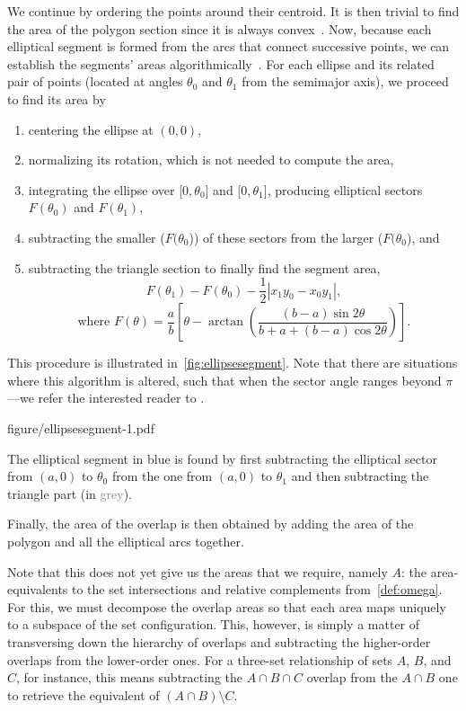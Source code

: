 \documentclass[
  oneside,
  openany,
  numbers=noendperiod,
  parskip=half,
  bibliography=totoc
]{scrbook}\usepackage[]{graphicx}\usepackage{xcolor}
\begin{document}
We continue by ordering the points around their centroid. It is then trivial to
find the area of the
polygon section since it is always convex~\citep{Finley_2006}. Now, because each
elliptical segment is formed from the arcs that connect successive
points, we can establish the segments' areas algorithmically~\citep{Eberly_2016}.
For each ellipse and its related pair of points (located at angles $\theta_0$ and
$\theta_1$ from the semimajor axis), we proceed to find its area by
\begin{enumerate}
\item centering the ellipse at $(0, 0)$,
\item normalizing its rotation, which is not needed to compute the area,
\item integrating the ellipse over [$0,\theta_0$] and [$0,\theta_1$], producing
  elliptical sectors $F(\theta_0)$ and $F(\theta_1)$,
\item subtracting the smaller ($F(\theta_0$)) of these sectors from the larger ($F(\theta_0$), and
\item subtracting the triangle section to finally find the segment area,
  \begin{equation*}
  F(\theta_1) - F(\theta_0) - \frac{1}{2}\left|x_1y_0 - x_0y_1\right|,
  \label{eq:segmentArea}
  \end{equation*}
  \[
  \text{where } F(\theta) = \frac{a}{b}\left[ \theta - \arctan{\left(\frac{(b - a)\sin{2\theta}}{b + a +(b - a )\cos{2\theta}} \right)}\right].
  \]
\end{enumerate}
This procedure is illustrated in~\cref{fig:ellipsesegment}. Note that there are
situations where this algorithm is altered, such that when the sector angle
ranges beyond $\pi$---we refer the interested reader to \citet{Eberly_2016}.

\begin{marginfigure}
figure/ellipsesegment-1.pdf
\caption{The elliptical segment in \textcolor{SteelBlue4}{blue} is found by
first subtracting the elliptical sector from $(a, 0)$ to $\theta_0$ from the one
from $(a, 0)$ to $\theta_1$ and then subtracting the triangle part
(in \textcolor{Grey}{grey}).}
\label{fig:ellipsesegment}
\end{marginfigure}

Finally, the area of the overlap is then obtained by adding the area of the
polygon and all the elliptical arcs together.

Note that this does not yet give us
the areas that we require, namely $A$: the area-equivalents to the set intersections
and relative complements from~\cref{def:omega}. For this, we must
decompose the overlap areas so that each area maps uniquely
to a subspace of the set configuration. This, however, is simply a matter of transversing down the
hierarchy of overlaps and subtracting the higher-order overlaps from the
lower-order ones. For a three-set relationship of sets $A$, $B$, and $C$,
for instance, this means subtracting the $A\cap B \cap C$ overlap from
the $A \cap B$ one to retrieve the equivalent of $(A \cap B) \setminus C$.
\end{document}
